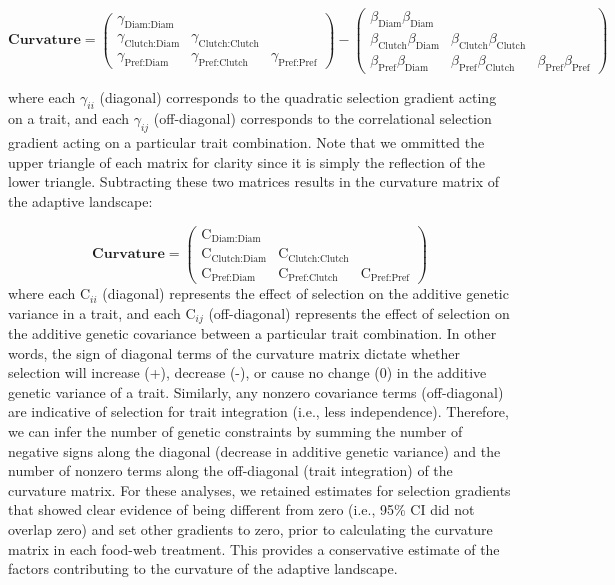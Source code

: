 \documentclass[11pt,]{article}
\begin{document}
\[\textbf{Curvature} = \begin{pmatrix} \gamma_{\text{Diam:Diam}}&& \\ \gamma_{\text{Clutch:Diam}}&\gamma_{\text{Clutch:Clutch}}& \\ \gamma_{\text{Pref:Diam}} & \gamma_{\text{Pref:Clutch}} &\gamma_{\text{Pref:Pref}} \end{pmatrix} - \begin{pmatrix} \beta_{\text{Diam}}\beta_{\text{Diam}}&& \\ \beta_{\text{Clutch}}\beta_{\text{Diam}}&\beta_{\text{Clutch}}\beta_{\text{Clutch}}& \\ \beta_{\text{Pref}}\beta_{\text{Diam}} & \beta_{\text{Pref}}\beta_{\text{Clutch}} &\beta_{\text{Pref}}\beta_{\text{Pref}} \end{pmatrix}\]

where each \(\gamma_{ii}\) (diagonal) corresponds to the quadratic
selection gradient acting on a trait, and each \(\gamma_{ij}\)
(off-diagonal) corresponds to the correlational selection gradient
acting on a particular trait combination. Note that we ommitted the
upper triangle of each matrix for clarity since it is simply the
reflection of the lower triangle. Subtracting these two matrices results
in the curvature matrix of the adaptive landscape:

\[\textbf{Curvature} = \begin{pmatrix} \text{C}_{\text{Diam:Diam}}&& \\ \text{C}_{\text{Clutch:Diam}} & \text{C}_{\text{Clutch:Clutch}} & \\ \text{C}_{\text{Pref:Diam}} & \text{C}_{\text{Pref:Clutch}} & \text{C}_{\text{Pref:Pref}} \end{pmatrix}\]
where each \(\text{C}_{ii}\) (diagonal) represents the effect of
selection on the additive genetic variance in a trait, and each
\(\text{C}_{ij}\) (off-diagonal) represents the effect of selection on
the additive genetic covariance between a particular trait combination.
In other words, the sign of diagonal terms of the curvature matrix
dictate whether selection will increase (+), decrease (-), or cause no
change (0) in the additive genetic variance of a trait. Similarly, any
nonzero covariance terms (off-diagonal) are indicative of selection for
trait integration (i.e., less independence). Therefore, we can infer the
number of genetic constraints by summing the number of negative signs
along the diagonal (decrease in additive genetic variance) and the
number of nonzero terms along the off-diagonal (trait integration) of
the curvature matrix. For these analyses, we retained estimates for
selection gradients that showed clear evidence of being different from
zero (i.e., 95\% CI did not overlap zero) and set other gradients to
zero, prior to calculating the curvature matrix in each food-web
treatment. This provides a conservative estimate of the factors
contributing to the curvature of the adaptive landscape.
\end{document}
